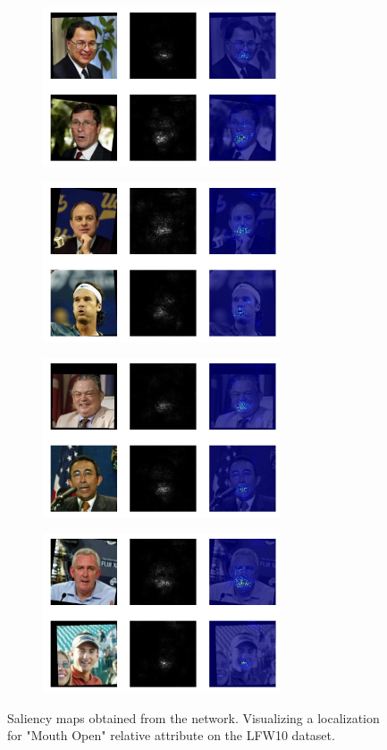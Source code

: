 \documentclass[10pt,twocolumn,letterpaper]{article}
\begin{document}
\begin{figure}
    \centering
    \begin{subfigure}
        \centering
        \includegraphics[width=7cm]{saliency-new/LFW/mouthopen-1}
    \end{subfigure}
    \begin{subfigure}
        \centering
        \includegraphics[width=7cm]{saliency-new/LFW/mouthopen-2}
    \end{subfigure}
    \begin{subfigure}
        \centering
        \includegraphics[width=7cm]{saliency-new/LFW/mouthopen-4}
    \end{subfigure}
    \begin{subfigure}
        \centering
        \includegraphics[width=7cm]{saliency-new/LFW/mouthopen-6}
    \end{subfigure}
    
    \caption{Saliency maps obtained from the network. Visualizing a localization for "Mouth Open" relative attribute on the LFW10 dataset.}
    \label{sal.lfw.mouthopen}
\end{figure}
\end{document}

